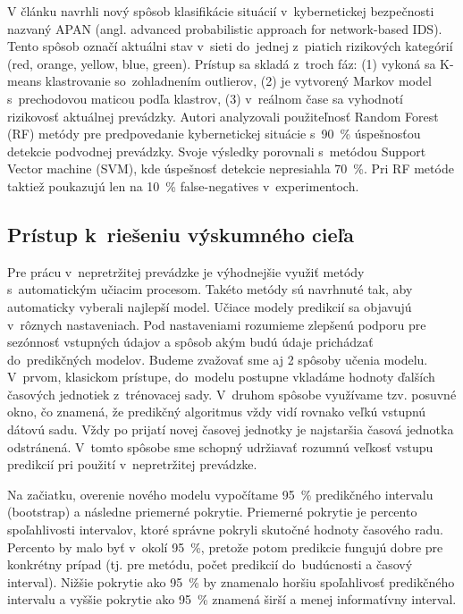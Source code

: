 \documentclass[thesismargins, thesislinespacing, openright, upjsfrontpage]{rnthesis}
\begin{document}
V článku \cite{shin2013advanced} navrhli nový spôsob klasifikácie situácií v~kybernetickej bezpečnosti nazvaný APAN (angl. advanced probabilistic approach for network-based IDS). Tento spôsob označí aktuálni stav v~sieti do~jednej z~piatich rizikových kategórií ({red, orange, yellow, blue, green}). Prístup sa skladá z~troch fáz: (1) vykoná sa K-means klastrovanie so~zohladnením outlierov, (2) je vytvorený Markov model s~prechodovou maticou podľa klastrov, (3) v~reálnom čase sa vyhodnotí rizikovosť aktuálnej prevádzky. Autori \cite{liu2015cloudy} analyzovali použiteľnosť Random Forest (RF) metódy pre predpovedanie kybernetickej situácie s~90~\% úspešnosťou detekcie podvodnej prevádzky. Svoje výsledky porovnali s~metódou Support Vector machine (SVM), kde úspešnosť detekcie nepresiahla 70~\%. Pri RF metóde taktiež poukazujú len na 10~\% false-negatives v~experimentoch.

\subsection{Prístup k~riešeniu výskumného cieľa}\label{c2_metodologia}

Pre prácu v~nepretržitej prevádzke je výhodnejšie využiť metódy s~automatickým učiacim procesom. Takéto metódy sú navrhnuté tak, aby automaticky vyberali najlepší model. Učiace modely predikcií sa objavujú v~rôznych nastaveniach. Pod nastaveniami rozumieme zlepšenú podporu pre sezónnosť vstupných údajov a spôsob akým budú údaje prichádzať do~predikčných modelov. Budeme zvažovať sme aj 2 spôsoby učenia modelu. V~prvom, klasickom prístupe, do~modelu postupne vkladáme hodnoty ďalších časových jednotiek z~trénovacej sady. V~druhom spôsobe využívame tzv. posuvné okno, čo znamená, že predikčný algoritmus vždy vidí rovnako veľkú vstupnú dátovú sadu. Vždy po prijatí novej časovej jednotky je najstaršia časová jednotka odstránená. V~tomto spôsobe sme schopný udržiavať rozumnú veľkosť vstupu predikcií pri použití v~nepretržitej prevádzke.

Na začiatku, overenie nového modelu vypočítame 95~\% predikčného intervalu (bootstrap) a následne priemerné pokrytie. Priemerné pokrytie je percento spoľahlivosti intervalov, ktoré správne pokryli skutočné hodnoty časového radu. Percento by malo byť v~okolí 95~\%, pretože potom predikcie fungujú dobre pre konkrétny prípad (tj. pre metódu, počet predikcií do~budúcnosti a časový interval). Nižšie pokrytie ako 95~\% by znamenalo horšiu spoľahlivosť predikčného intervalu a vyššie pokrytie ako 95~\% znamená širší a menej informatívny interval.
\end{document}
